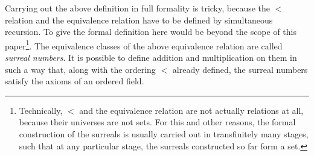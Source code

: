 \documentclass[twoside,11pt]{article}
\begin{document}
Carrying out the above definition in full formality is tricky,
because the $<$ relation and the equivalence relation have to be
defined by simultaneous recursion.
To give the formal definition here would be beyond the scope of this
paper\footnote{Technically, $<$ and the equivalence relation are not actually
relations at all, because their
universes are not sets. For this and other reasons, the formal construction of the surreals
is usually carried out in transfinitely many stages, such that at any particular stage,
the surreals constructed so far form a set.}.
The equivalence classes of the above equivalence relation are called
\emph{surreal numbers}. It is possible to define addition and multiplication
on them in such a way that, along with the ordering $<$ already defined,
the surreal numbers satisfy the axioms of an ordered field.
\end{document}
